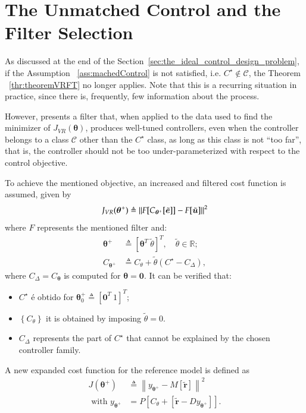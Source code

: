 \section{The Unmatched Control and the Filter Selection}%
\label{sec:filtro_caso_não_linear}
As discussed at the end of the Section~\ref{sec:the_ideal_control_design_problem}, if the Assumption ~\ref{ass:machedControl} is not satisfied, i.e. $C^\star \not\in \mathscr{C}$, the Theorem ~\ref{thr:theoremVRFT} no longer applies. Note that this is a recurring situation in practice, since there is, frequently, few information about the process.

However, \cite{campi2006} presents a filter that, when applied to the data used to find the minimizer of $J_{VR}(\bm{\theta})$, produces well-tuned controllers, even when the controller belongs to a class $\mathscr{C}$ other than the $C^\star$ class, as long as this class is not ``too far'', that is, the controller should not be too under-parameterized with respect to the control objective.

To achieve the mentioned objective, an increased and filtered cost function is assumed, given by
\begin{equation}
   J_{VR}(\bm{\theta}^{+}) \triangleq \left\lVert F[C_{\bm{\theta}^{+}}[\tilde{\bm{e}}]] - F[\tilde{\bm{u}}]\right\rVert^2
\label{eq:JVRplus}
\end{equation}
where $F$ represents the mentioned filter and:
\begin{align}
   \bm{\theta}^+ &\triangleq  [\bm{\theta}^{T} \ \tilde{\theta} ]^T, \quad \tilde{\theta} \in \mathbb{R} ; \\
   C_{\bm{\theta}^+} &\triangleq C_{\theta}+\tilde{\theta}\left(C^\star-C_\Delta\right),
\end{align}
where $C_\Delta=C_{\bm{\theta}}$ is computed for $\bm{\theta}=\bm{0}$. It can be verified that:
\begin{itemize}
   \setlength\itemsep{0.1pt}
   \renewcommand{\labelitemi}{--}
   \item $C^\star$ é obtido for $\bm{\theta}_0^+ \triangleq [\bm{0}^T\ 1]^T$;
   \item $\left\{C_{\theta}\right\}$ it is obtained by imposing $\tilde{\theta} = 0$.
   \item $C_\Delta$ represents the part of $C^\star$ that cannot be explained by the chosen controller family.
\end{itemize}

A new expanded cost function for the reference model is defined as
\begin{align}
   J\left(\bm{\theta}^+\right) &\triangleq \left\|y_{\bm{\theta}^+}-M[\tilde{\bm{r}}]\right\|^2 \\
   \text{ with } y_{\bm{\theta}^+} &=P\left[C_{\theta}+\left[\tilde{\bm{r}}-D y_{\bm{\theta}^+}\right]\right] .
\end{align}

